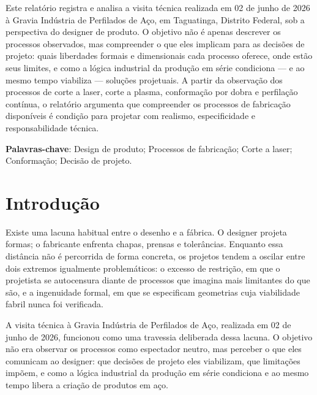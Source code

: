 \documentclass[12pt,a4paper,oneside,brazil,chapter=TITLE]{article}
\newcommand{\secbreak}{\clearpage}
\let\oldsection\section
\renewcommand{\section}{\secbreak\oldsection}
\begin{document}
\noindent
Este relatório registra e analisa a visita técnica realizada em 02 de junho de 2026 à Gravia Indústria de Perfilados de Aço, em Taguatinga, Distrito Federal, sob a perspectiva do designer de produto. O objetivo não é apenas descrever os processos observados, mas compreender o que eles implicam para as decisões de projeto: quais liberdades formais e dimensionais cada processo oferece, onde estão seus limites, e como a lógica industrial da produção em série condiciona --- e ao mesmo tempo viabiliza --- soluções projetuais. A partir da observação dos processos de corte a laser, corte a plasma, conformação por dobra e perfilação contínua, o relatório argumenta que compreender os processos de fabricação disponíveis é condição para projetar com realismo, especificidade e responsabilidade técnica.

\vspace{12pt}
\noindent
\textbf{Palavras-chave}: Design de produto; Processos de fabricação; Corte a laser; Conformação; Decisão de projeto.

\clearpage
\tableofcontents


\section{Introdução}

Existe uma lacuna habitual entre o desenho e a fábrica. O designer projeta formas; o fabricante enfrenta chapas, prensas e tolerâncias. Enquanto essa distância não é percorrida de forma concreta, os projetos tendem a oscilar entre dois extremos igualmente problemáticos: o excesso de restrição, em que o projetista se autocensura diante de processos que imagina mais limitantes do que são, e a ingenuidade formal, em que se especificam geometrias cuja viabilidade fabril nunca foi verificada.

A visita técnica à Gravia Indústria de Perfilados de Aço, realizada em 02 de junho de 2026, funcionou como uma travessia deliberada dessa lacuna. O objetivo não era observar os processos como espectador neutro, mas perceber o que eles comunicam ao designer: que decisões de projeto eles viabilizam, que limitações impõem, e como a lógica industrial da produção em série condiciona e ao mesmo tempo libera a criação de produtos em aço.
\end{document}
